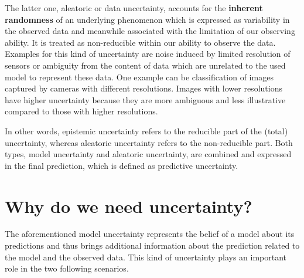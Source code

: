 The latter one, aleatoric or data uncertainty, accounts for the \textbf{inherent randomness} of an underlying phenomenon which is expressed as variability in the observed data and meanwhile associated with the limitation of our observing ability. It is treated as non-reducible within our ability to observe the data. Examples for this kind of uncertainty are noise induced by limited resolution of sensors or ambiguity from the content of data which are unrelated to the used model to represent these data. One example can be classification of images captured by cameras with different resolutions. Images with lower resolutions have higher uncertainty because they are more ambiguous and less illustrative compared to those with higher resolutions. 

In other words, epistemic uncertainty refers to the reducible part of the (total) uncertainty, whereas aleatoric uncertainty refers to the non-reducible part. 
Both types, model uncertainty and aleatoric uncertainty, are combined and expressed in the final prediction, which is defined as predictive uncertainty.

\section{Why do we need uncertainty?}
The aforementioned model uncertainty represents the belief of a model about its predictions and thus brings additional information about the prediction related to the model and the observed data. This kind of uncertainty plays an important role in the two following scenarios. 


